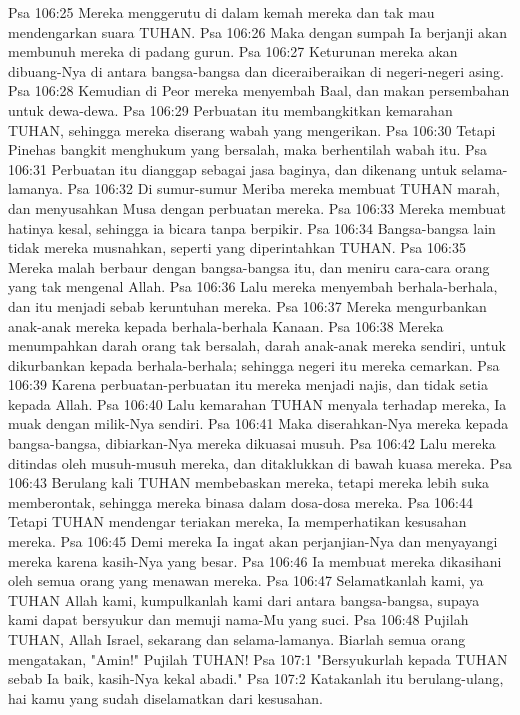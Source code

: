 Psa 106:25  Mereka menggerutu di dalam kemah mereka dan tak mau mendengarkan suara TUHAN.
Psa 106:26  Maka dengan sumpah Ia berjanji akan membunuh mereka di padang gurun.
Psa 106:27  Keturunan mereka akan dibuang-Nya di antara bangsa-bangsa dan diceraiberaikan di negeri-negeri asing.
Psa 106:28  Kemudian di Peor mereka menyembah Baal, dan makan persembahan untuk dewa-dewa.
Psa 106:29  Perbuatan itu membangkitkan kemarahan TUHAN, sehingga mereka diserang wabah yang mengerikan.
Psa 106:30  Tetapi Pinehas bangkit menghukum yang bersalah, maka berhentilah wabah itu.
Psa 106:31  Perbuatan itu dianggap sebagai jasa baginya, dan dikenang untuk selama-lamanya.
Psa 106:32  Di sumur-sumur Meriba mereka membuat TUHAN marah, dan menyusahkan Musa dengan perbuatan mereka.
Psa 106:33  Mereka membuat hatinya kesal, sehingga ia bicara tanpa berpikir.
Psa 106:34  Bangsa-bangsa lain tidak mereka musnahkan, seperti yang diperintahkan TUHAN.
Psa 106:35  Mereka malah berbaur dengan bangsa-bangsa itu, dan meniru cara-cara orang yang tak mengenal Allah.
Psa 106:36  Lalu mereka menyembah berhala-berhala, dan itu menjadi sebab keruntuhan mereka.
Psa 106:37  Mereka mengurbankan anak-anak mereka kepada berhala-berhala Kanaan.
Psa 106:38  Mereka menumpahkan darah orang tak bersalah, darah anak-anak mereka sendiri, untuk dikurbankan kepada berhala-berhala; sehingga negeri itu mereka cemarkan.
Psa 106:39  Karena perbuatan-perbuatan itu mereka menjadi najis, dan tidak setia kepada Allah.
Psa 106:40  Lalu kemarahan TUHAN menyala terhadap mereka, Ia muak dengan milik-Nya sendiri.
Psa 106:41  Maka diserahkan-Nya mereka kepada bangsa-bangsa, dibiarkan-Nya mereka dikuasai musuh.
Psa 106:42  Lalu mereka ditindas oleh musuh-musuh mereka, dan ditaklukkan di bawah kuasa mereka.
Psa 106:43  Berulang kali TUHAN membebaskan mereka, tetapi mereka lebih suka memberontak, sehingga mereka binasa dalam dosa-dosa mereka.
Psa 106:44  Tetapi TUHAN mendengar teriakan mereka, Ia memperhatikan kesusahan mereka.
Psa 106:45  Demi mereka Ia ingat akan perjanjian-Nya dan menyayangi mereka karena kasih-Nya yang besar.
Psa 106:46  Ia membuat mereka dikasihani oleh semua orang yang menawan mereka.
Psa 106:47  Selamatkanlah kami, ya TUHAN Allah kami, kumpulkanlah kami dari antara bangsa-bangsa, supaya kami dapat bersyukur dan memuji nama-Mu yang suci.
Psa 106:48  Pujilah TUHAN, Allah Israel, sekarang dan selama-lamanya. Biarlah semua orang mengatakan, "Amin!" Pujilah TUHAN!
Psa 107:1  "Bersyukurlah kepada TUHAN sebab Ia baik, kasih-Nya kekal abadi."
Psa 107:2  Katakanlah itu berulang-ulang, hai kamu yang sudah diselamatkan dari kesusahan.
